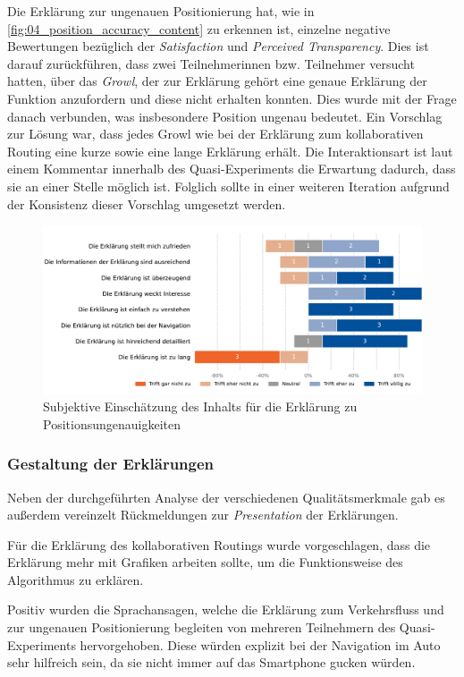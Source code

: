 Die Erklärung zur ungenauen Positionierung hat, wie in \autoref{fig:04_position_accuracy_content} zu erkennen ist, einzelne negative Bewertungen bezüglich der \textit{Satisfaction} und \textit{Perceived Transparency}. Dies ist darauf zurückführen, dass zwei Teilnehmerinnen bzw. Teilnehmer versucht hatten, über das \textit{Growl}, der zur Erklärung gehört eine genaue Erklärung der Funktion anzufordern und diese nicht erhalten konnten. Dies wurde mit der Frage danach verbunden, was insbesondere \glqq Position ungenau\grqq{} bedeutet. Ein Vorschlag zur Lösung war, dass jedes \glqq Growl\grqq{} wie bei der Erklärung zum kollaborativen Routing eine kurze sowie eine lange Erklärung erhält. Die Interaktionsart ist laut einem Kommentar innerhalb des Quasi-Experiments die Erwartung dadurch, dass sie an einer Stelle möglich ist. Folglich sollte in einer weiteren Iteration aufgrund der Konsistenz dieser Vorschlag umgesetzt werden.

\begin{figure}[b!]
    \centering
    \includegraphics[width=\textwidth]{contents/06_model_evaluation/02_evaluation/res/qualitativeFeedback-04_position_accuracy_content.pdf}
    \caption{Subjektive Einschätzung des Inhalts für die Erklärung zu Positionsungenauigkeiten}
    \label{fig:04_position_accuracy_content}
\end{figure}

\subsubsection{Gestaltung der Erklärungen}

Neben der durchgeführten Analyse der verschiedenen Qualitätsmerkmale gab es außerdem vereinzelt Rückmeldungen zur \textit{Presentation} der Erklärungen.

Für die Erklärung des kollaborativen Routings wurde vorgeschlagen, dass die Erklärung mehr mit Grafiken arbeiten sollte, um die Funktionsweise des Algorithmus zu erklären.

Positiv wurden die Sprachansagen, welche die Erklärung zum Verkehrsfluss und zur ungenauen Positionierung begleiten von mehreren Teilnehmern des Quasi-Experiments hervorgehoben. Diese würden explizit bei der Navigation im Auto sehr hilfreich sein, da sie nicht immer auf das Smartphone gucken würden.